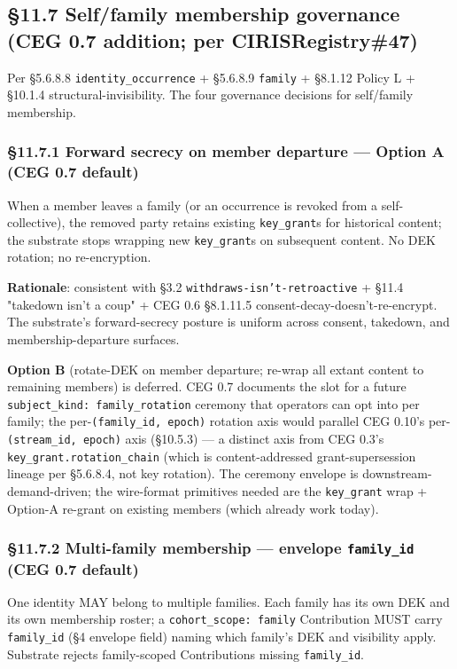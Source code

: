 \documentclass[10pt]{article}
\begin{document}
\subsection*{§11.7 Self/family membership governance (CEG 0.7 addition; per CIRISRegistry\#47)}


Per §5.6.8.8 \texttt{identity\_occurrence} + §5.6.8.9 \texttt{family} + §8.1.12 Policy L + §10.1.4 structural-invisibility. The four governance decisions for self/family membership.


\subsubsection*{§11.7.1 Forward secrecy on member departure — Option A (CEG 0.7 default)}


When a member leaves a family (or an occurrence is revoked from a self-collective), the removed party retains existing \texttt{key\_grant}s for historical content; the substrate stops wrapping new \texttt{key\_grant}s on subsequent content. No DEK rotation; no re-encryption.


\textbf{Rationale}: consistent with §3.2 \texttt{withdraws-isn't-retroactive} + §11.4 "takedown isn't a coup" + CEG 0.6 §8.1.11.5 consent-decay-doesn't-re-encrypt. The substrate's forward-secrecy posture is uniform across consent, takedown, and membership-departure surfaces.


\textbf{Option B} (rotate-DEK on member departure; re-wrap all extant content to remaining members) is deferred. CEG 0.7 documents the slot for a future \texttt{subject\_kind: family\_rotation} ceremony that operators can opt into per family; the per-\texttt{(family\_id, epoch)} rotation axis would parallel CEG 0.10's per-\texttt{(stream\_id, epoch)} axis (§10.5.3) — a distinct axis from CEG 0.3's \texttt{key\_grant.rotation\_chain} (which is content-addressed grant-supersession lineage per §5.6.8.4, not key rotation). The ceremony envelope is downstream-demand-driven; the wire-format primitives needed are the \texttt{key\_grant} wrap + Option-A re-grant on existing members (which already work today).


\subsubsection*{§11.7.2 Multi-family membership — envelope \texttt{family\_id} (CEG 0.7 default)}


One identity MAY belong to multiple families. Each family has its own DEK and its own membership roster; a \texttt{cohort\_scope: family} Contribution MUST carry \texttt{family\_id} (§4 envelope field) naming which family's DEK and visibility apply. Substrate rejects family-scoped Contributions missing \texttt{family\_id}.
\end{document}
